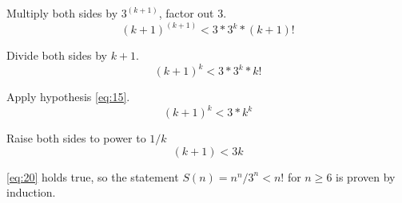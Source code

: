 \documentclass[12pt]{article}
\begin{document}
Multiply both sides by $3^{(k+1)}$, factor out $3$.
\begin{equation}
    (k+1)^{(k+1)} < 3*3^k*(k+1)!
\end{equation}

Divide both sides by $k+1$.
\begin{equation}
    (k+1)^{k} < 3*3^k*k!
\end{equation}

Apply hypothesis \eqref{eq:15}.
\begin{equation}
    (k+1)^{k} < 3*k^{k}
\end{equation}

Raise both sides to power to $1/k$
\begin{equation}
    (k+1) < 3k
    \label{eq:20}
\end{equation}

\eqref{eq:20} holds true, so the statement $S(n) = n^n/3^n < n!$ for $n \geq 6$
is proven by induction.
\end{document}
